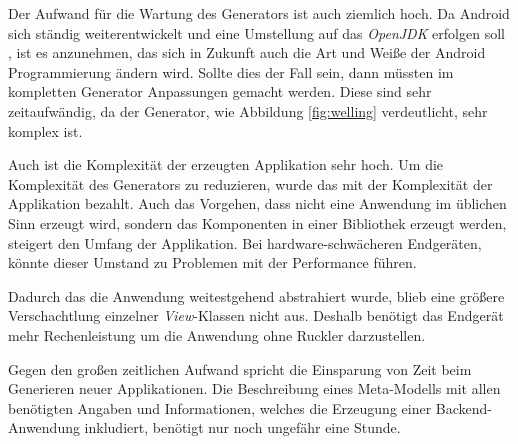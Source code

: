 Der Aufwand für die Wartung des Generators ist auch ziemlich hoch. Da Android sich ständig weiterentwickelt und eine Umstellung auf das \textit{OpenJDK} erfolgen soll \cite{jdk}, ist es anzunehmen, das sich in Zukunft auch die Art und Weiße der Android Programmierung ändern wird. Sollte dies der Fall sein, dann müssten im kompletten Generator Anpassungen gemacht werden. Diese sind sehr zeitaufwändig, da der Generator, wie Abbildung \ref{fig:welling} verdeutlicht, sehr komplex ist.

Auch ist die Komplexität der erzeugten Applikation sehr hoch. Um die Komplexität des Generators zu reduzieren, wurde das mit der Komplexität der Applikation bezahlt. Auch das Vorgehen, dass nicht eine Anwendung im üblichen Sinn erzeugt wird, sondern das Komponenten in einer Bibliothek erzeugt werden, steigert den Umfang der Applikation. Bei hardware-schwächeren Endgeräten, könnte dieser Umstand zu Problemen mit der Performance führen. 

Dadurch das die Anwendung weitestgehend abstrahiert wurde, blieb eine größere Verschachtlung einzelner \textit{View}-Klassen nicht aus. Deshalb benötigt das Endgerät mehr Rechenleistung um die Anwendung ohne Ruckler darzustellen.

Gegen den großen zeitlichen Aufwand spricht die Einsparung von Zeit beim Generieren neuer Applikationen. Die Beschreibung eines Meta-Modells mit allen benötigten Angaben und Informationen, welches die Erzeugung einer Backend-Anwendung inkludiert, benötigt nur noch ungefähr eine Stunde. 